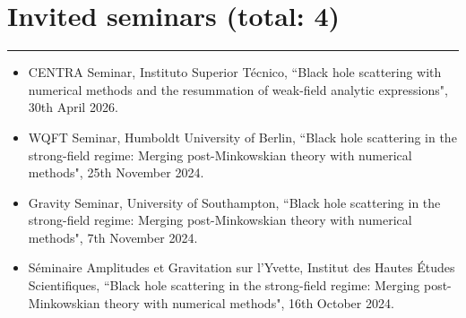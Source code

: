 \documentclass[10.5pt, oneside]{article}   	%
\begin{document}
\newpage
  {\color{Sectioncolour}
\section*{Invited seminars {\rm (total: 4)}}
\vspace{-3mm}
\noindent\rule{\linewidth}{0.6pt}}
\begin{itemize}
\item CENTRA Seminar, Instituto Superior Técnico, ``Black hole scattering with numerical methods and the resummation of weak-field analytic expressions", 30th April 2026.
\item WQFT Seminar, Humboldt University of Berlin, ``Black hole scattering in the strong-field regime: Merging post-Minkowskian theory with numerical methods", 25th November 2024.
\item Gravity Seminar, University of Southampton, ``Black hole scattering in the strong-field regime: Merging post-Minkowskian theory with numerical methods", 7th November 2024.
\item Séminaire Amplitudes et Gravitation sur l'Yvette, Institut des Hautes Études Scientifiques, ``Black hole scattering in the strong-field regime: Merging post-Minkowskian theory with numerical methods", 16th October 2024.
\end{itemize}
\end{document}
